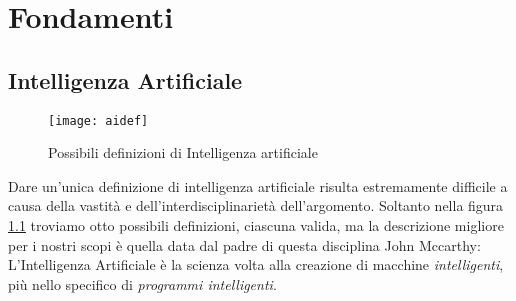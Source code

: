 \chapter{Fondamenti}

\section{Intelligenza Artificiale}

\begin{figure}
    \texttt{[image: aidef]}
    \caption{Possibili definizioni di Intelligenza artificiale}
    \label{fig:ai}
  \end{figure}
Dare un'unica definizione di intelligenza artificiale risulta estremamente difficile a causa della vastità
e dell'interdisciplinarietà dell'argomento. Soltanto nella figura \ref{fig:ai} troviamo otto possibili definizioni, ciascuna valida, ma
la descrizione  migliore per i nostri scopi  è quella data dal padre di questa disciplina John Mccarthy:
L'Intelligenza Artificiale è la scienza volta alla creazione di macchine  \emph{intelligenti},
più nello specifico di \emph{programmi intelligenti}.\cite{ai}

